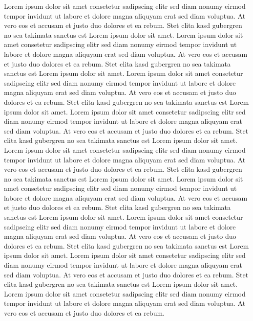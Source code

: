 \documentclass[master,german,smartquotes]{hgbthesis}
\begin{document}
Lorem ipsum dolor sit amet consetetur sadipscing elitr sed diam nonumy eirmod tempor invidunt ut labore et dolore magna aliquyam erat sed diam voluptua. At vero eos et accusam et justo duo dolores et ea rebum. Stet clita kasd gubergren no sea takimata sanctus est Lorem ipsum dolor sit amet. Lorem ipsum dolor sit amet consetetur sadipscing elitr sed diam nonumy eirmod tempor invidunt ut labore et dolore magna aliquyam erat sed diam voluptua. At vero eos et accusam et justo duo dolores et ea rebum. Stet clita kasd gubergren no sea takimata sanctus est Lorem ipsum dolor sit amet. Lorem ipsum dolor sit amet consetetur sadipscing elitr sed diam nonumy eirmod tempor invidunt ut labore et dolore magna aliquyam erat sed diam voluptua. At vero eos et accusam et justo duo dolores et ea rebum. Stet clita kasd gubergren no sea takimata sanctus est Lorem ipsum dolor sit amet. Lorem ipsum dolor sit amet consetetur sadipscing elitr sed diam nonumy eirmod tempor invidunt ut labore et dolore magna aliquyam erat sed diam voluptua. At vero eos et accusam et justo duo dolores et ea rebum. Stet clita kasd gubergren no sea takimata sanctus est Lorem ipsum dolor sit amet. Lorem ipsum dolor sit amet consetetur sadipscing elitr sed diam nonumy eirmod tempor invidunt ut labore et dolore magna aliquyam erat sed diam voluptua. At vero eos et accusam et justo duo dolores et ea rebum. Stet clita kasd gubergren no sea takimata sanctus est Lorem ipsum dolor sit amet. Lorem ipsum dolor sit amet consetetur sadipscing elitr sed diam nonumy eirmod tempor invidunt ut labore et dolore magna aliquyam erat sed diam voluptua. At vero eos et accusam et justo duo dolores et ea rebum. 
\clearpage
Stet clita kasd gubergren no sea takimata sanctus est Lorem ipsum dolor sit amet. Lorem ipsum dolor sit amet consetetur sadipscing elitr sed diam nonumy eirmod tempor invidunt ut labore et dolore magna aliquyam erat sed diam voluptua. At vero eos et accusam et justo duo dolores et ea rebum. Stet clita kasd gubergren no sea takimata sanctus est Lorem ipsum dolor sit amet. Lorem ipsum dolor sit amet consetetur sadipscing elitr sed diam nonumy eirmod tempor invidunt ut labore et dolore magna aliquyam erat sed diam voluptua. At vero eos et accusam et justo duo dolores et ea rebum. Stet clita kasd gubergren no sea takimata sanctus est Lorem ipsum dolor sit amet. Lorem ipsum dolor sit amet consetetur sadipscing elitr sed diam nonumy eirmod tempor invidunt ut labore et dolore magna aliquyam erat sed diam voluptua. At vero eos et accusam et justo duo dolores et ea rebum. 
\clearpage
\end{document}
